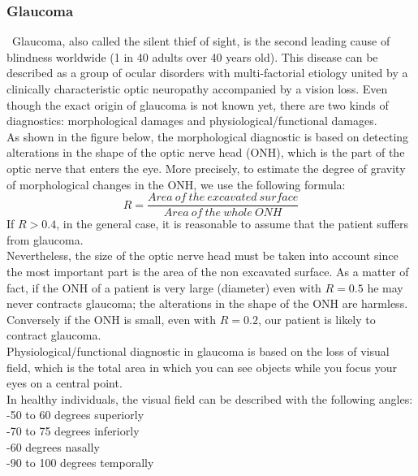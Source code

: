 \documentclass[english,12pt]{article}
\begin{document}
\subsubsection{Glaucoma}\
\indent Glaucoma, also called the silent thief of sight, is the second leading cause of blindness worldwide (1 in 40 adults over 40 years old). This disease can be described as a group of ocular disorders with multi-factorial etiology united by a clinically characteristic optic neuropathy accompanied by a vision loss. Even though the exact origin of glaucoma is not known yet, there are two kinds of diagnostics: morphological damages and physiological/functional damages.\\
As shown in the figure below, the morphological diagnostic is based on detecting alterations in the shape of the optic nerve head (ONH), which is the part of the optic nerve that enters the eye.
 More precisely, to estimate the degree of gravity of morphological changes in the ONH, we use the following formula:
$$ R=\frac{Area\ of\ the\ excavated\ surface}{Area\ of\ the\ whole\ ONH}$$
If $R>0.4$, in the general case, it is reasonable to assume that the patient suffers from glaucoma.\\

Nevertheless, the size of the optic nerve head must be taken into account since the most important part is the area of the non excavated surface. As a matter of fact, if the ONH of a patient is very large (diameter) even with $R=0.5$ he may never contracts glaucoma; the alterations in the shape of the ONH are harmless. Conversely if the ONH is small, even with $R=0.2$, our patient is likely to contract glaucoma.\\

Physiological/functional diagnostic in glaucoma is based on the loss of visual field, which is the total area in which you can see objects while you focus your eyes on a central point.\\
In healthy individuals, the visual field can be described with the following angles:\\
-50 to 60 degrees superiorly\\
-70 to 75 degrees inferiorly\\
-60 degrees nasally\\
-90 to 100 degrees temporally\\
\end{document}
